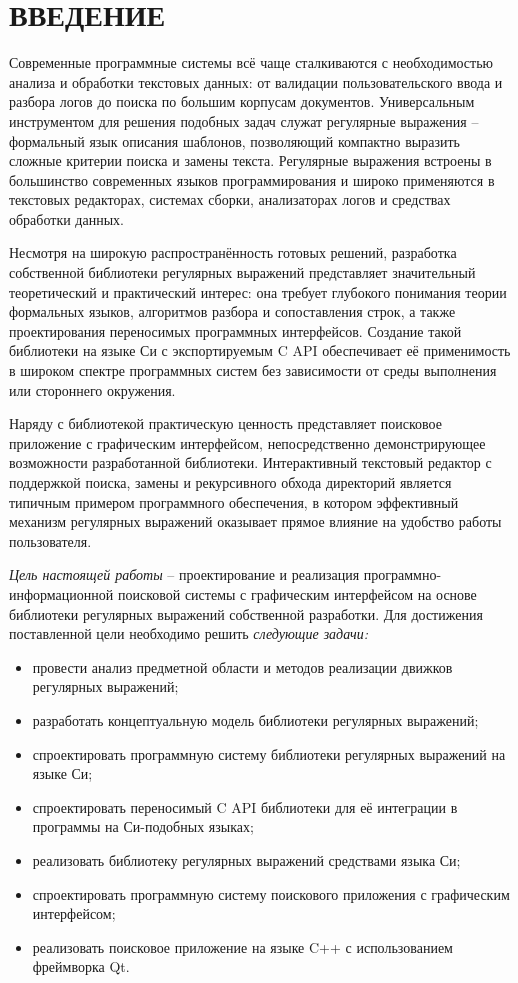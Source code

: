 \section*{ВВЕДЕНИЕ}

Современные программные системы всё чаще сталкиваются с необходимостью анализа и обработки текстовых данных: от валидации пользовательского ввода и разбора логов до поиска по большим корпусам документов. Универсальным инструментом для решения подобных задач служат регулярные выражения -- формальный язык описания шаблонов, позволяющий компактно выразить сложные критерии поиска и замены текста. Регулярные выражения встроены в большинство современных языков программирования и широко применяются в текстовых редакторах, системах сборки, анализаторах логов и средствах обработки данных.

Несмотря на широкую распространённость готовых решений, разработка собственной библиотеки регулярных выражений представляет значительный теоретический и практический интерес: она требует глубокого понимания теории формальных языков, алгоритмов разбора и сопоставления строк, а также проектирования переносимых программных интерфейсов. Создание такой библиотеки на языке Си с экспортируемым C API обеспечивает её применимость в широком спектре программных систем без зависимости от среды выполнения или стороннего окружения.

Наряду с библиотекой практическую ценность представляет поисковое приложение с графическим интерфейсом, непосредственно демонстрирующее возможности разработанной библиотеки. Интерактивный текстовый редактор с поддержкой поиска, замены и рекурсивного обхода директорий является типичным примером программного обеспечения, в котором эффективный механизм регулярных выражений оказывает прямое влияние на удобство работы пользователя.

\emph{Цель настоящей работы} -- проектирование и реализация программно-информационной поисковой системы с графическим интерфейсом на основе библиотеки регулярных выражений собственной разработки. Для достижения поставленной цели необходимо решить \emph{следующие задачи:}
\begin{itemize}
	\item провести анализ предметной области и методов реализации движков регулярных выражений;
	\item разработать концептуальную модель библиотеки регулярных выражений;
	\item спроектировать программную систему библиотеки регулярных выражений на языке Си;
	\item спроектировать переносимый C API библиотеки для её интеграции в программы на Си-подобных языках;
	\item реализовать библиотеку регулярных выражений средствами языка Си;
	\item спроектировать программную систему поискового приложения с графическим интерфейсом;
	\item реализовать поисковое приложение на языке C++ с использованием фреймворка Qt.
\end{itemize}

